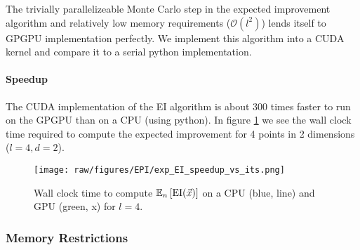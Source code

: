 \documentclass[index]{subfiles}
\begin{document}
The trivially parallelizeable Monte Carlo step in the expected improvement algorithm and relatively low memory requirements ($\mathcal{O}(l^{2})$) lends itself to GPGPU implementation perfectly. We implement this algorithm into a CUDA kernel and compare it to a serial python implementation.

%
%

\paragraph{Speedup}

The CUDA implementation of the EI algorithm is about 300 times faster to run on the GPGPU than on a CPU (using python). In figure \ref{GPUspeed1} we see the wall clock time required to compute the expected improvement for 4 points in 2 dimensions ($l=4, d=2$).

 \begin{figure}[hpt]
 	\centerline{\texttt{[image: raw/figures/EPI/exp\_EI\_speedup\_vs\_its.png]}}
    \caption[CPU vs GPU time to compute EI]{Wall clock time to compute $\mathbb{E}_{n}\left[{\rm EI}(\vec{x})\right]$ on a CPU (blue, line) and GPU (green, x) for $l = 4$.}
 	\label{GPUspeed1}
 \end{figure}

%
%

\subsubsection{Memory Restrictions} %
\label{sub:Memory Restrictions}
\end{document}
